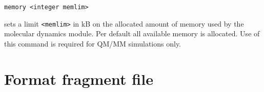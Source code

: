 \begin{description}
\item
\begin{verbatim}
memory <integer memlim>
\end{verbatim}
sets a limit \verb+<memlim>+ in kB on the allocated amount of memory used by 
the molecular dynamics module.
Per default all available memory is allocated. Use of this command
is required for QM/MM simulations only.
\end{description}

\section {Format fragment file}

